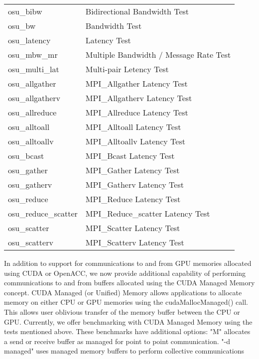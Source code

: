 \begin{center}
\begin{tabular}{ll}
osu\_bibw & Bidirectional Bandwidth Test\\
osu\_bw & Bandwidth Test\\
osu\_latency & Latency Test\\
osu\_mbw\_mr & Multiple Bandwidth / Message Rate Test \\
osu\_multi\_lat & Multi-pair Letency Test \\ 
osu\_allgather & MPI\_Allgather Latency Test \\
osu\_allgatherv & MPI\_Allgatherv Latency Test \\
osu\_allreduce & MPI\_Allreduce Latency Test \\
osu\_alltoall & MPI\_Alltoall Latency Test \\
osu\_alltoallv & MPI\_Alltoallv Latency Test \\
osu\_bcast & MPI\_Bcast Latency Test \\
osu\_gather & MPI\_Gather Latency Test \\ 
osu\_gatherv & MPI\_Gatherv Latency Test \\
osu\_reduce & MPI\_Reduce Latency Test \\
osu\_reduce\_scatter & MPI\_Reduce\_scatter Latency Test \\
osu\_scatter & MPI\_Scatter Latency Test \\
osu\_scatterv & MPI\_Scatterv Latency Test \\
\end{tabular}
\end{center}

\noindent In addition to support for communications to and from GPU memories allocated 
using CUDA or OpenACC, we now provide additional capability of performing communications 
to and from buffers allocated using the CUDA Managed Memory concept. CUDA Managed (or Unified) 
Memory allows applications to allocate memory on either CPU or GPU memories using the 
cudaMallocManaged() call. This allows user oblivious transfer of the memory buffer between the 
CPU or GPU. Currently, we offer benchmarking with CUDA Managed Memory using the tests mentioned 
above. These benchmarks have additional options: "M" allocates a send or receive buffer as 
managed for point to point communication. "-d managed" uses managed memory buffers to perform 
collective communications

